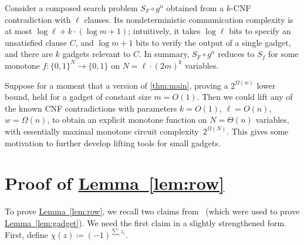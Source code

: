 \documentclass[11pt]{article}
\numberwithin{equation}{section}
\theoremstyle{definition}
\theoremstyle{plain}
\newcommand{\expref}[2]{\hyperref[#2]{#1~\ref{#2}}}
\newcommand{\bit}{\{0,1\}}
\begin{document}
Consider a composed search problem $S_F\circ g^n$ obtained from a $k$-CNF contradiction with $\ell$ clauses. Its nondeterministic communication complexity is at most $\log\ell + k\cdot(\log m +1)$; intuitively, it takes $\log\ell$ bits to specify an unsatisfied clause $C$, and $\log m+1$ bits to verify the output of a single gadget, and there are $k$ gadgets relevant to $C$. In summary, $S_F \circ g^n$ reduces to $S_f$ for some monotone $f : \bit^N \to \bit$ on $N = \ell \cdot (2m)^k$ variables.

Suppose for a moment that a version of \autoref{thm:main}, proving a $2^{\Omega(w)}$ lower bound, held for a gadget of constant size $m=O(1)$. Then we could lift any of the known CNF contradictions with parameters $k=O(1)$, $\ell=O(n)$, $w=\Omega(n)$, to obtain an explicit monotone function on $N=\Theta(n)$ variables, with essentially maximal monotone circuit complexity~$2^{\Omega(N)}$. This gives some motivation to further develop lifting tools for small gadgets.

\section{Proof of \expref{Lemma}{lem:row}}\label{sec:row-lem-proof}

To prove \expref{Lemma}{lem:row}, we recall two claims from~\cite{goos17bpp} (which were used to prove \expref{Lemma}{lem:gadget}). We need the first claim in a slightly strengthened form. First, define $\chi(z) \coloneqq (-1)^{\sum_i z_i}$.
\end{document}
